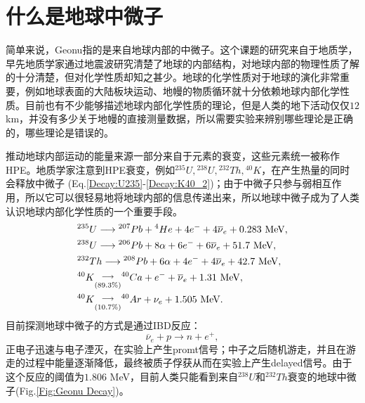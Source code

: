 		\section{什么是地球中微子}
			简单来说，Geonu指的是来自地球内部的中微子。这个课题的研究来自于地质学，早先地质学家通过地震波研究清楚了地球的内部结构，对地球内部的物理性质了解的十分清楚，但对化学性质却知之甚少。地球的化学性质对于地球的演化非常重要，例如地球表面的大陆板块运动、地幔的物质循环就十分依赖地球内部化学性质。目前也有不少能够描述地球内部化学性质的理论，但是人类的地下活动仅仅$12$ km，并没有多少关于地幔的直接测量数据，所以需要实验来辨别哪些理论是正确的，哪些理论是错误的。\par
			推动地球内部运动的能量来源一部分来自于元素的衰变，这些元素统一被称作HPE。地质学家注意到HPE衰变，例如${}^{235}U, {}^{238}U, {}^{232}Th, {}^{40}K$，在产生热量的同时会释放中微子\cite{fiorentini2007geo} (Eq.\ref{Decay:U235}-\ref{Decay:K40_2})；由于中微子只参与弱相互作用，所以它可以很轻易地将地球内部的信息传递出来，所以地球中微子成为了人类认识地球内部化学性质的一个重要手段。
				\begin{align}
					&{}^{235}U \longrightarrow {}^{207}Pb + {}^{4}He + 4e^- + 4\overline{\nu}_e + 0.283 \text{ MeV},
					\label{Decay:U235}\\
					&{}^{238}U \longrightarrow {}^{206}Pb + 8\alpha + 6e^- + 6\overline{\nu}_e + 51.7 \text{ MeV},
					\label{Decay:U238}\\
					&{}^{232}Th \longrightarrow {}^{208}Pb + 6\alpha + 4e^- + 4\overline{\nu}_e + 42.7 \text{ MeV},
					\label{Decay:Th232}\\
					&{}^{40}K \overunderset{\longrightarrow}{(89.3\%)} {}^{40}Ca + e^- + \overline{\nu}_e + 1.31 \text{ MeV},
					\label{Decay:K40_1}\\
					&{}^{40}K \overunderset{\longrightarrow}{(10.7\%)} {}^{40}Ar + \nu_e + 1.505 \text{ MeV}.
					\label{Decay:K40_2}
				\end{align}
			目前探测地球中微子的方式是通过IBD反应：
				\begin{equation}
					\overline{\nu}_e + p \longrightarrow n + e^+,
				\end{equation}
			正电子迅速与电子湮灭，在实验上产生promt信号；中子之后随机游走，并且在游走的过程中能量逐渐降低，最终被质子俘获从而在实验上产生delayed信号。由于这个反应的阈值为$1.806$ MeV，目前人类只能看到来自${}^{238}U$和${}^{232}Th$衰变的地球中微子(Fig.\ref{Fig:Geonu Decay})。
